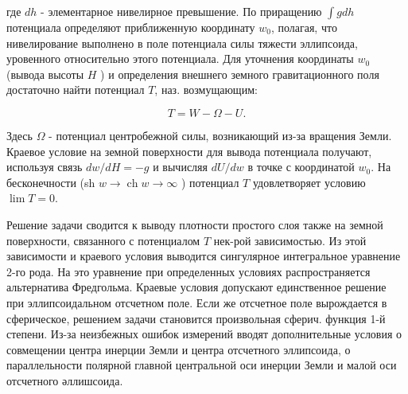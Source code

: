 \documentclass[10pt]{article}
\begin{document}
где $d h$ - элементарное нивелирное превышение. По приращению $\int g d h$ потенциала определяют приближенную координату $w_{0}$, полагая, что нивелирование выполнено в поле потенциала силы тяжести эллипсоида, уровенного относительно этого потенциала. Для уточнения координаты $w_{0}$ (вывода высоты $H$ ) и определения внешнего земного гравитационного поля достаточно найти потенциал $T$, наз. возмущающим:



\[

T=W-\Omega-U .

\]



Здесь $\Omega$ - потенциал центробежной силы, возникающий из-за вращения Земли. Краевое условие на земной поверхности для вывода потенциала получают, используя связь $d w / d H=-g$ и вычисляя $d U / d w$ в точке с координатой $w_{0}$. На бесконечности (sh $w \rightarrow \operatorname{ch} w \rightarrow \infty$ ) потенциал $T$ удовлетворяет условию $\lim T=0$.



Решение задачи сводится к выводу плотности простого слоя также на земной поверхности, связанного с потенциалом $T$ нек-рой зависимостью. Из этой зависимости и краевого условия выводится сингулярное интегральное уравнение 2-го рода. На это уравнение при определенных условиях распространяется альтернатива Фредгольма. Краевые условия допускают единственное решение при эллипсоидальном отсчетном поле. Если же отсчетное поле вырождается в сферическое, решением задачи становится произвольная сферич. функция 1-й степени. Из-за неизбежных ошибок измерений вводят дополнительные условия о совмещении центра инерции Земли и центра отсчетного эллипсоида, о параллельности полярной главной центральной оси инерции Земли и малой оси отсчетного әллишсоида.
\end{document}
